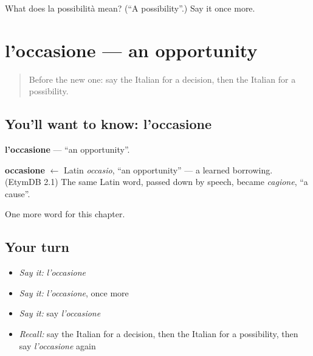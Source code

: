 \begin{tcolorbox}[breakable,colback=teal!4,colframe=teal!35!black,title={Before you move on}]
What does la possibilità mean? (\textquotedblleft{}A possibility\textquotedblright{}.) Say it once more.
\end{tcolorbox}
\section[l'occasione]{l'occasione — an opportunity}

\label{lesson:IT-C225-occasione}



\begin{quote}
Before the new one: say the Italian for a decision, then the Italian for a possibility.
\end{quote}

\subsection*{You'll want to know: l'occasione}
\textbf{l'occasione} — \textquotedblleft{}an opportunity\textquotedblright{}.

\begin{cousinweb}
\textbf{occasione} $\leftarrow$ Latin \emph{occasio}, \textquotedblleft{}an opportunity\textquotedblright{} — a learned borrowing. (EtymDB 2.1) The same Latin word, passed down by speech, became \emph{cagione}, \textquotedblleft{}a cause\textquotedblright{}.
\end{cousinweb}

\begin{grammarlens}[title={What you've built}]
One more word for this chapter.
\end{grammarlens}

\subsection*{Your turn}
\begin{itemize}
\raggedright
  \item \emph{Say it:} \emph{l'occasione}
  \item \emph{Say it:} \emph{l'occasione}, once more
  \item \emph{Say it:} say \emph{l'occasione}
  \item \emph{Recall:} say the Italian for a decision, then the Italian for a possibility, then say \emph{l'occasione} again
\end{itemize}

